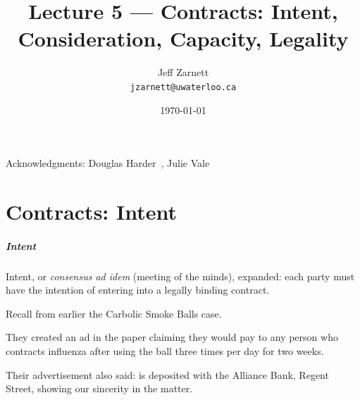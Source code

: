 

\title{Lecture 5 --- Contracts: Intent, Consideration, Capacity, Legality}

\author{Jeff Zarnett \\ \small \texttt{jzarnett@uwaterloo.ca}}
\date{\today}




\begin{frame}
  \titlepage

\begin{center}
  \small{Acknowledgments: Douglas Harder~\cite{dwh}, Julie Vale~\cite{jv}}
  \end{center}
\end{frame}

\part{Contracts: Intent}

\begin{frame}
\partpage
\end{frame}

\begin{frame}
\frametitle{Intent}

Intent, or \textit{consensus ad idem} (meeting of the minds), expanded: each party must have the intention of entering into a legally binding contract.

Recall from earlier the Carbolic Smoke Balls case.

They created an ad in the paper claiming they would pay  to any person who contracts influenza after using the ball three times per day for two weeks.

Their advertisement also said:  is deposited with the Alliance Bank, Regent Street, showing our sincerity in the matter.

\end{frame}



